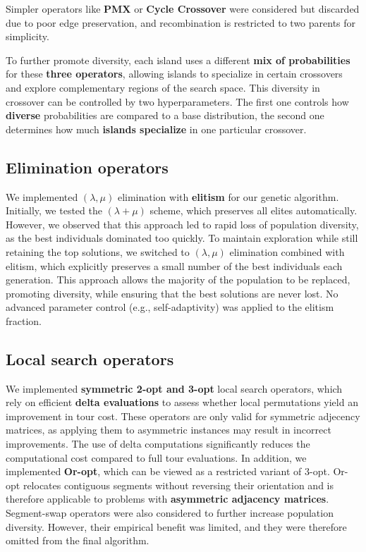 \documentclass[a4paper,10pt]{article} %
\begin{document}
\noindent
Simpler operators like \textbf{PMX} or \textbf{Cycle Crossover} were considered but discarded due to poor edge preservation, and recombination is restricted to two parents for simplicity. 

\noindent
To further promote diversity, each island uses a different \textbf{mix of probabilities} for these \textbf{three operators}, allowing islands to specialize in certain crossovers and explore complementary regions of the search space. This diversity in crossover can be controlled by two hyperparameters. The first one controls how \textbf{diverse} probabilities are compared to a base distribution, the second one determines how much \textbf{islands specialize} in one particular crossover.

\subsection{Elimination operators}\label{sec_elimination}
We implemented $(\lambda, \mu)$ elimination with \textbf{elitism} for our genetic algorithm. Initially, we tested the $(\lambda + \mu)$ scheme, which preserves all elites automatically. However, we observed that this approach led to rapid loss of population diversity, as the best individuals dominated too quickly. To maintain exploration while still retaining the top solutions, we switched to $(\lambda, \mu)$ elimination combined with elitism, which explicitly preserves a small number of the best individuals each generation. This approach allows the majority of the population to be replaced, promoting diversity, while ensuring that the best solutions are never lost. No advanced parameter control (e.g., self-adaptivity) was applied to the elitism fraction.

\subsection{Local search operators}\label{sec_lso}
\noindent
We implemented \textbf{symmetric 2-opt and 3-opt} local search operators, which rely on efficient \textbf{delta evaluations} to assess whether local permutations yield an improvement in tour cost. These operators are only valid for symmetric adjecency matrices, as applying them to asymmetric instances may result in incorrect improvements. The use of delta computations significantly reduces the computational cost compared to full tour evaluations. In addition, we implemented \textbf{Or-opt}, which can be viewed as a restricted variant of 3-opt. Or-opt relocates contiguous segments without reversing their orientation and is therefore applicable to problems with \textbf{asymmetric adjacency matrices}. Segment-swap operators were also considered to further increase population diversity. However, their empirical benefit was limited, and they were therefore omitted from the final algorithm.
\end{document}
